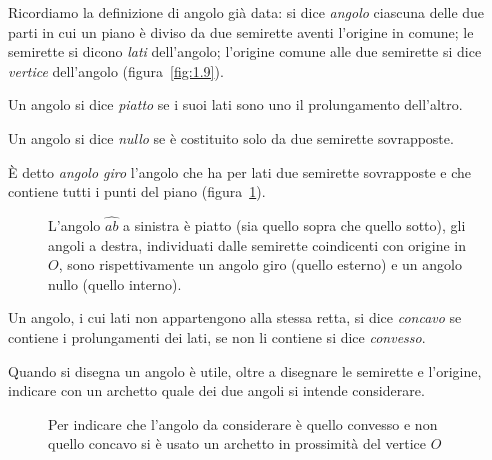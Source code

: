 Ricordiamo la definizione di angolo già data: si dice \emph{angolo} ciascuna delle due parti in cui un piano è diviso da due semirette aventi l'origine in comune; le semirette si dicono \emph{lati} dell'angolo; l'origine comune alle due semirette si dice \emph{vertice} dell'angolo (figura~\ref{fig:1.9}).

\begin{definizione}
Un angolo si dice \emph{piatto} se i suoi lati sono uno il prolungamento dell'altro.
\end{definizione}

\begin{definizione}
Un angolo si dice \emph{nullo} se è costituito solo da due semirette sovrapposte.
\end{definizione}

\begin{definizione}
\`E detto \emph{angolo giro} l'angolo che ha per lati due semirette sovrapposte e che contiene tutti i punti del piano (figura~\ref{fig:1.19}).
\end{definizione}
\begin{figure}[bth]
 \centering 
 \caption{L'angolo  $\widehat{ab}$ a sinistra è piatto (sia quello sopra che quello sotto), gli angoli a destra, individuati dalle semirette coindicenti con origine in $O$, sono rispettivamente un angolo giro (quello esterno) e un angolo nullo (quello interno).}\label{fig:1.19}
\end{figure}

\begin{definizione}
Un angolo, i cui lati non appartengono alla stessa retta, si dice \emph{concavo} se contiene i prolungamenti dei lati, se non li contiene si dice \emph{convesso}.
\end{definizione}

\begin{figure*}[htb]
\centering  
\caption{L'angolo concavo è quello in giallo in quanto contiene i prolungamenti dei lati (punteggiati)}\label{fig:1.20}
\end{figure*}

Quando si disegna un angolo è utile, oltre a disegnare le semirette e l'origine, indicare con un archetto quale dei due angoli si intende considerare.

\begin{figure}[htb]
 \centering 
\caption{Per indicare che l'angolo da considerare è quello convesso e non quello concavo si è usato un archetto in prossimità del vertice $O$}\label{fig:1.21}
\end{figure}

